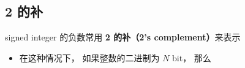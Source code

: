 
\subsection{2 的补}
signed integer 的负数常用 \textbf{2 的补（2's complement）}来表示
\begin{itemize}
\item 在这种情况下， 如果整数的二进制为 $N$ bit， 那么
\end{itemize}
